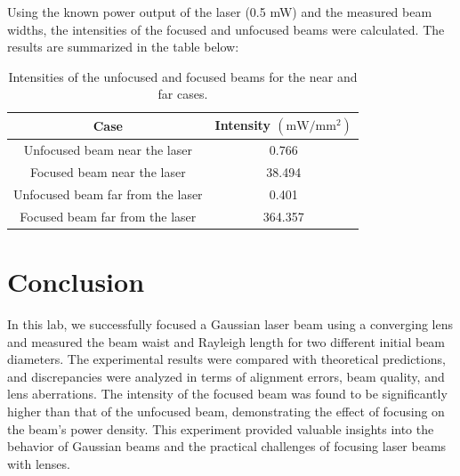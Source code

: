 \documentclass[12pt]{article}
\begin{document}
Using the known power output of the laser (0.5 mW) and the measured beam widths, the intensities of the focused and unfocused beams were calculated. The results are summarized in the table below:

\begin{table}[H]
    \centering
    \begin{tabular}{|c|c|}
        \hline
        \textbf{Case} & \textbf{Intensity $(\text{mW}/\text{mm}^2)$} \\
        \hline
        Unfocused beam near the laser & 0.766 \\
        Focused beam near the laser & 38.494 \\
        Unfocused beam far from the laser & 0.401 \\
        Focused beam far from the laser & 364.357 \\
        \hline
    \end{tabular}
    \caption{Intensities of the unfocused and focused beams for the near and far cases.}
    \label{tab:intensities}
\end{table}

\section{Conclusion}
In this lab, we successfully focused a Gaussian laser beam using a converging lens and measured the beam waist and Rayleigh length for two different initial beam diameters. The experimental results were compared with theoretical predictions, and discrepancies were analyzed in terms of alignment errors, beam quality, and lens aberrations. The intensity of the focused beam was found to be significantly higher than that of the unfocused beam, demonstrating the effect of focusing on the beam's power density. This experiment provided valuable insights into the behavior of Gaussian beams and the practical challenges of focusing laser beams with lenses.
\end{document}
